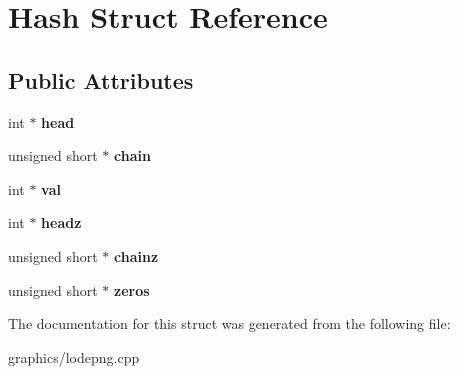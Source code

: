 \hypertarget{struct_hash}{\section{Hash Struct Reference}
\label{struct_hash}
}
\subsection*{Public Attributes}
\begin{DoxyCompactItemize}
\item 
\hypertarget{struct_hash_a0977cf12b1d8e6bbc784b5e0877926f5}{int $\ast$ {\bfseries head}}\label{struct_hash_a0977cf12b1d8e6bbc784b5e0877926f5}

\item 
\hypertarget{struct_hash_abf6ad3db2f652a19cc4ff0792e477899}{unsigned short $\ast$ {\bfseries chain}}\label{struct_hash_abf6ad3db2f652a19cc4ff0792e477899}

\item 
\hypertarget{struct_hash_a66918968854722efdf7ab5f8ac2c6c1d}{int $\ast$ {\bfseries val}}\label{struct_hash_a66918968854722efdf7ab5f8ac2c6c1d}

\item 
\hypertarget{struct_hash_a3ed8f51297a858686e11a1a295a3a39c}{int $\ast$ {\bfseries headz}}\label{struct_hash_a3ed8f51297a858686e11a1a295a3a39c}

\item 
\hypertarget{struct_hash_a04ef237e7bc2fa99bc7305fb2352084d}{unsigned short $\ast$ {\bfseries chainz}}\label{struct_hash_a04ef237e7bc2fa99bc7305fb2352084d}

\item 
\hypertarget{struct_hash_a7247caa3e23eaba8f0d199ec5010c931}{unsigned short $\ast$ {\bfseries zeros}}\label{struct_hash_a7247caa3e23eaba8f0d199ec5010c931}

\end{DoxyCompactItemize}


The documentation for this struct was generated from the following file\+:\begin{DoxyCompactItemize}
\item 
graphics/lodepng.\+cpp\end{DoxyCompactItemize}
